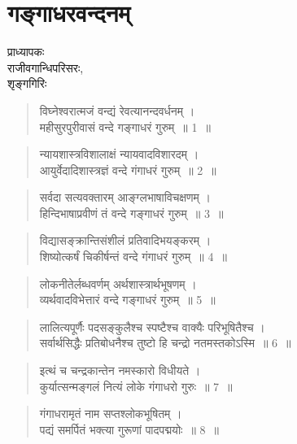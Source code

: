 {\fontsize{15}{17}\selectfont
\chapter{गङ्गाधरवन्दनम्}

\begin{center}
\smallskip

प्राध्यापकः\\
राजीवगान्धिपरिसरः,\\
शृङ्गगिरिः
\addrule
\end{center}

\begin{verse}
विघ्नेश्वरात्मजं वन्द्यं  रेवत्यानन्दवर्धनम् ।\\
महीसुरपुरीवासं वन्दे गङ्गाधरं गुरुम्~॥ 1~॥
\end{verse}

\begin{verse}
न्यायशास्त्रविशालाक्षं न्यायवादविशारदम् ।\\
आयुर्वेदादिशास्त्रज्ञं वन्दे गंगाधरं गुरुम्~॥ 2~॥
\end{verse}

\begin{verse}
सर्वदा सत्यवक्तारम् आङ्ग्लभाषाविचक्षणम् ।\\
हिन्दिभाषाप्रवीणं तं वन्दे गङ्गाधरं गुरुम्~॥ 3~॥
\end{verse}

\begin{verse}
विद्यासङ्क्रान्तिसंशीलं प्रतिवादिभयङ्करम् ।\\
शिष्योत्कर्षं चिकीर्षन्तं वन्दे गंगाधरं गुरुम्~॥ 4~॥
\end{verse}

\begin{verse}
लोकनीतेर्लब्धवर्णम् अर्थशास्त्रार्थभूषणम् ।\\
व्यर्थवादविभेत्तारं वन्दे गङ्गाधरं गुरुम्~॥ 5~॥
\end{verse}

\begin{verse}
लालित्यपूर्णैः पदसङ्कुलैश्च स्पष्टैश्च वाक्यैः परिभूषितैश्च ।\\
सर्वार्थसिद्धैः प्रतिबोधनैश्च तुष्टो हि चन्द्रो नतमस्तकोऽस्मि~॥ 6~॥
\end{verse}

\begin{verse}
इत्थं च चन्द्रकान्तेन नमस्कारो विधीयते ।\\
कुर्यात्सन्मङ्गलं नित्यं लोके गंगाधरो गुरुः~॥ 7~॥
\end{verse}

\begin{verse}
गंगाधरामृतं नाम सप्तश्लोकभूषितम्  ।\\
पद्यं समर्पितं भक्त्या गुरूणां पादपद्मयोः~॥ 8~॥
\end{verse}

\articleend
}
